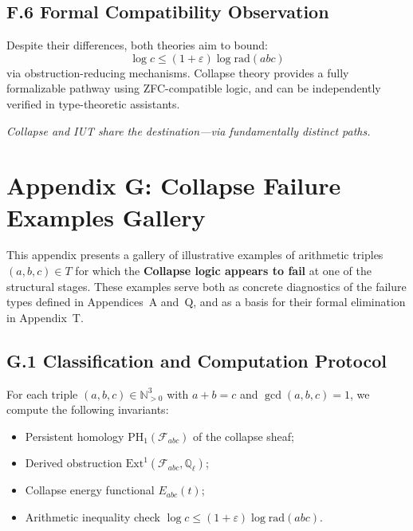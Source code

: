 \documentclass[11pt]{article}
\begin{document}
\subsection*{F.6 Formal Compatibility Observation}

Despite their differences, both theories aim to bound:
\[
\log c \leq (1 + \varepsilon) \log \mathrm{rad}(abc)
\]
via obstruction-reducing mechanisms. Collapse theory provides a fully formalizable pathway  
using ZFC-compatible logic, and can be independently verified in type-theoretic assistants.

\begin{center}
\textit{Collapse and IUT share the destination—via fundamentally distinct paths.}
\end{center}



\section*{Appendix G: Collapse Failure Examples Gallery}

This appendix presents a gallery of illustrative examples of arithmetic triples \( (a,b,c) \in T \)  
for which the \textbf{Collapse logic appears to fail} at one of the structural stages.  
These examples serve both as concrete diagnostics of the failure types defined in Appendices~A and~Q,  
and as a basis for their formal elimination in Appendix~T.

\subsection*{G.1 Classification and Computation Protocol}

For each triple \( (a,b,c) \in \mathbb{N}_{>0}^3 \) with \( a + b = c \) and \( \gcd(a,b,c)=1 \), we compute the following invariants:
\begin{itemize}
  \item Persistent homology \( \mathrm{PH}_1(\mathcal{F}_{abc}) \) of the collapse sheaf;
  \item Derived obstruction \( \mathrm{Ext}^1(\mathcal{F}_{abc}, \mathbb{Q}_\ell) \);
  \item Collapse energy functional \( E_{abc}(t) \);
  \item Arithmetic inequality check \( \log c \leq (1+\varepsilon)\log \mathrm{rad}(abc) \).
\end{itemize}
\end{document}
